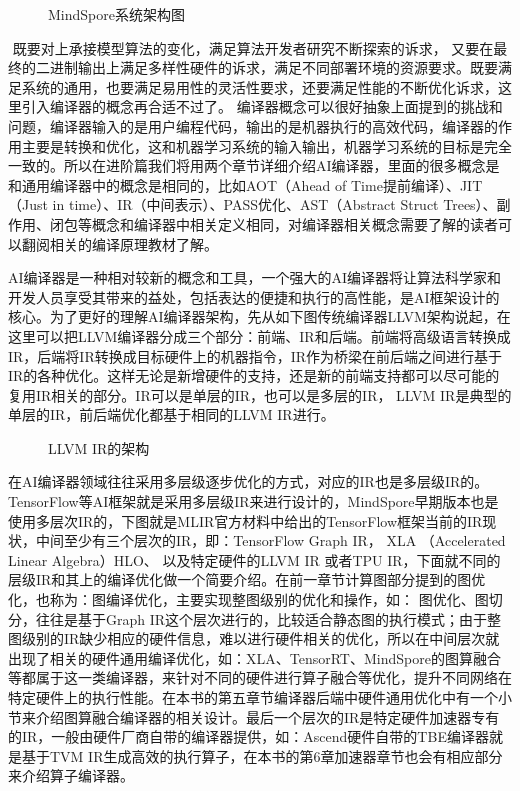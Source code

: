 \documentclass[letterpaper,10pt,english]{sphinxmanual}
\begin{document}
\begin{figure}[H]
\centering
\capstart

\noindent{}
\caption{MindSpore系统架构图}\label{\detokenize{chapter_preface_advanced/index:id3}}\end{figure}

\sphinxAtStartPar
​ 既要对上承接模型算法的变化，满足算法开发者研究不断探索的诉求，
又要在最终的二进制输出上满足多样性硬件的诉求，满足不同部署环境的资源要求。既要满足系统的通用，也要满足易用性的灵活性要求，还要满足性能的不断优化诉求，这里引入编译器的概念再合适不过了。
编译器概念可以很好抽象上面提到的挑战和问题，编译器输入的是用户编程代码，输出的是机器执行的高效代码，编译器的作用主要是转换和优化，这和机器学习系统的输入输出，机器学习系统的目标是完全一致的。所以在进阶篇我们将用两个章节详细介绍AI编译器，里面的很多概念是和通用编译器中的概念是相同的，比如AOT（Ahead
of Time提前编译）、JIT（Just in
time）、IR（中间表示）、PASS优化、AST（Abstract Struct
Trees）、副作用、闭包等概念和编译器中相关定义相同，对编译器相关概念需要了解的读者可以翻阅相关的编译原理教材了解。

\sphinxAtStartPar
​
AI编译器是一种相对较新的概念和工具，一个强大的AI编译器将让算法科学家和开发人员享受其带来的益处，包括表达的便捷和执行的高性能，是AI框架设计的核心。为了更好的理解AI编译器架构，先从如下图传统编译器LLVM架构说起，在这里可以把LLVM编译器分成三个部分：前端、IR和后端。前端将高级语言转换成IR，后端将IR转换成目标硬件上的机器指令，IR作为桥梁在前后端之间进行基于IR的各种优化。这样无论是新增硬件的支持，还是新的前端支持都可以尽可能的复用IR相关的部分。IR可以是单层的IR，也可以是多层的IR，
LLVM IR是典型的单层的IR，前后端优化都基于相同的LLVM IR进行。

\begin{figure}[H]
\centering
\capstart

\noindent{}
\caption{LLVM IR的架构}\label{\detokenize{chapter_preface_advanced/index:id4}}\end{figure}

\sphinxAtStartPar
​
在AI编译器领域往往采用多层级逐步优化的方式，对应的IR也是多层级IR的。TensorFlow等AI框架就是采用多层级IR来进行设计的，MindSpore早期版本也是使用多层次IR的，下图就是MLIR官方材料中给出的TensorFlow框架当前的IR现状，中间至少有三个层次的IR，即：TensorFlow
Graph IR， XLA （Accelerated Linear Algebra）HLO、 以及特定硬件的LLVM IR
或者TPU
IR，下面就不同的层级IR和其上的编译优化做一个简要介绍。在前一章节计算图部分提到的图优化，也称为：图编译优化，主要实现整图级别的优化和操作，如：
图优化、图切分，往往是基于Graph
IR这个层次进行的，比较适合静态图的执行模式；由于整图级别的IR缺少相应的硬件信息，难以进行硬件相关的优化，所以在中间层次就出现了相关的硬件通用编译优化，如：XLA、TensorRT、MindSpore的图算融合等都属于这一类编译器，来针对不同的硬件进行算子融合等优化，提升不同网络在特定硬件上的执行性能。在本书的第五章节编译器后端中硬件通用优化中有一个小节来介绍图算融合编译器的相关设计。最后一个层次的IR是特定硬件加速器专有的IR，一般由硬件厂商自带的编译器提供，如：Ascend硬件自带的TBE编译器就是基于TVM
IR生成高效的执行算子，在本书的第6章加速器章节也会有相应部分来介绍算子编译器。
\end{document}
